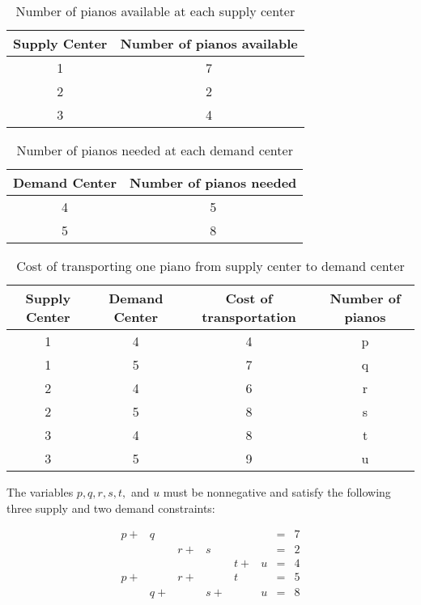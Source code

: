 \begin{table}[h]
\centering
\begin{tabular}{|c|c|}
Supply Center & Number of pianos available\\
\hline
1 & 7\\
2 & 2\\
3 & 4\\
\end{tabular}

\caption{Number of pianos available at each supply center}
\end{table}

\begin{table}[h]
\centering
\begin{tabular}{|c|c|}
Demand Center & Number of pianos needed\\
\hline
4 & 5\\
5 & 8\\
\end{tabular}

\caption{Number of pianos needed at each demand center}
\end{table}

\begin{table}[h]
\centering
\begin{tabular}{|c|c|c|c|}
Supply Center & Demand Center & Cost of transportation & Number of pianos\\
\hline
1 & 4 & 4 & p\\
1 & 5 & 7 & q\\
2 & 4 & 6 & r\\
2 & 5 & 8 & s\\
3 & 4 & 8 & t\\
3 & 5 & 9 & u\\
\end{tabular}
\caption{Cost of transporting one piano from supply center to demand center}
\end{table}

The variables $p,q,r,s,t,$ and $u$ must be nonnegative and satisfy the following three supply and two demand constraints:

\begin{align}
p +& q  &    &    &    &   &=& 7\\
   &    & r +& s  &    &   &=& 2\\
   &    &    &    & t +& u &=& 4\\
p +&    & r +&    & t  &   &=& 5\\
   & q +&    & s +&    & u &=& 8\\
\end{align}

